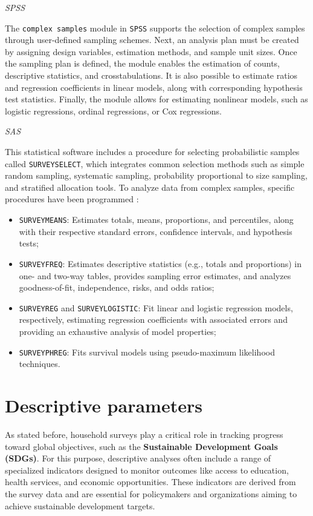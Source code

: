 \documentclass[
  12pt,
]{book}
\providecommand{\tightlist}{%
  \setlength{\itemsep}{0pt}\setlength{\parskip}{0pt}}
\begin{document}
\emph{SPSS}

The \texttt{complex\ samples} module in \texttt{SPSS} \citep{IBM_2017} supports the selection of complex samples through user-defined sampling schemes. Next, an analysis plan must be created by assigning design variables, estimation methods, and sample unit sizes. Once the sampling plan is defined, the module enables the estimation of counts, descriptive statistics, and crosstabulations. It is also possible to estimate ratios and regression coefficients in linear models, along with corresponding hypothesis test statistics. Finally, the module allows for estimating nonlinear models, such as logistic regressions, ordinal regressions, or Cox regressions.

\emph{SAS}

This statistical software includes a procedure for selecting probabilistic samples called \texttt{SURVEYSELECT}, which integrates common selection methods such as simple random sampling, systematic sampling, probability proportional to size sampling, and stratified allocation tools. To analyze data from complex samples, specific procedures have been programmed \citep{SAS_2017}:

\begin{itemize}
\tightlist
\item
  \texttt{SURVEYMEANS}: Estimates totals, means, proportions, and percentiles, along with their respective standard errors, confidence intervals, and hypothesis tests;
\item
  \texttt{SURVEYFREQ}: Estimates descriptive statistics (e.g., totals and proportions) in one- and two-way tables, provides sampling error estimates, and analyzes goodness-of-fit, independence, risks, and odds ratios;
\item
  \texttt{SURVEYREG} and \texttt{SURVEYLOGISTIC}: Fit linear and logistic regression models, respectively, estimating regression coefficients with associated errors and providing an exhaustive analysis of model properties;
\item
  \texttt{SURVEYPHREG}: Fits survival models using pseudo-maximum likelihood techniques.
\end{itemize}

\hypertarget{descriptive-parameters}{%
\chapter{Descriptive parameters}\label{descriptive-parameters}}

As stated before, household surveys play a critical role in tracking progress toward global objectives, such as the \textbf{Sustainable Development Goals (SDGs)}. For this purpose, descriptive analyses often include a range of specialized indicators designed to monitor outcomes like access to education, health services, and economic opportunities. These indicators are derived from the survey data and are essential for policymakers and organizations aiming to achieve sustainable development targets.
\end{document}
